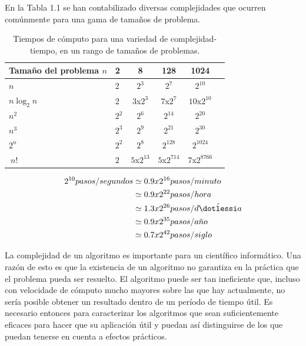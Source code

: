 \documentclass[10pt,a5paper]{book}
\begin{document}
En la Tabla 1.1 se han contabilizado diversas complejidades que ocurren comúnmente para una gama de tamaños de problema.
\begin{table}[!hbt]
\begin{center}
\caption{Tiempos de cómputo para una variedad de complejidad-tiempo, en un rango de tamaños de problemas.}
\begin{tabular}{|p{5cm}|l|c|c|c|c}
\hline
\hline
\backslashbox{Complejidad\\tiempo}{Tamaño del\\problema $n$} & 2 & 8 & 128 & 1024 \\
\hline
$n$ & 2 & $2^3$ & $2^7$ & $2^{10}$ \\
\hline
$n \log_2n$ & 2 & $3$x$2^3$ & $7$x$2^7$ & $10$x$2^{10}$ \\
\hline
$n^2$ & $2^2$ & $2^6$ & $2^{14}$ & $2^{20}$ \\
\hline
$n^3$ & $2^3$ & $2^9$ & $2^{21}$ & $2^{30}$ \\
\hline
$2^n$ & $2^2$ & $2^8$ & $2^{128}$ & $2^{1024}$ \\
\hline
$~n!$ & $2$ & $5$x$2^{13}$ & $5$x$2^{714}$ & $7$x$2^{8766}$ \\
\hline
\hline
\end{tabular}
\end{center}
\end{table}
\begin{subequations}
\begin{align}
2^{10} pasos/segundos & \simeq 0.9 x 2^{16} pasos/minuto\nonumber \\ & \simeq 0.9 x 2^{22} pasos/hora\nonumber \\ & \simeq 1.3 x 2^{26} pasos/d\acute{\dotlessi}a\nonumber \\ & \simeq 0.9 x 2^{35} pasos/a\tilde{n}o\nonumber \\ & \simeq 0.7 x 2^{42} pasos/siglo\nonumber
\end{align}
\end{subequations}

La complejidad de un algoritmo es importante para un científico informático. Una razón de esto es que la existencia de un algoritmo no garantiza en la práctica que el problema pueda ser resuelto. El algoritmo puede ser tan ineficiente que, incluso con velocidade de cómputo mucho mayores sobre las que hay actualmente, no sería posible obtener un resultado dentro de un período de tiempo útil. Es necesario entonces para caracterizar los algoritmos que sean suficientemente eficaces para hacer que su aplicación útil y puedan así distinguirse de los que puedan tenerse en cuenta a efectos prácticos.
\end{document}
